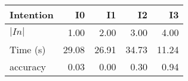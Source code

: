 \begin{tabular}{lrrrr}
\toprule
Intention & I0 & I1 & I2 & I3 \\
\midrule
$|In|$ & 1.00 & 2.00 & 3.00 & 4.00 \\
Time (s) & 29.08 & 26.91 & 34.73 & 11.24 \\
accuracy & 0.03 & 0.00 & 0.30 & 0.94 \\
\bottomrule
\end{tabular}
